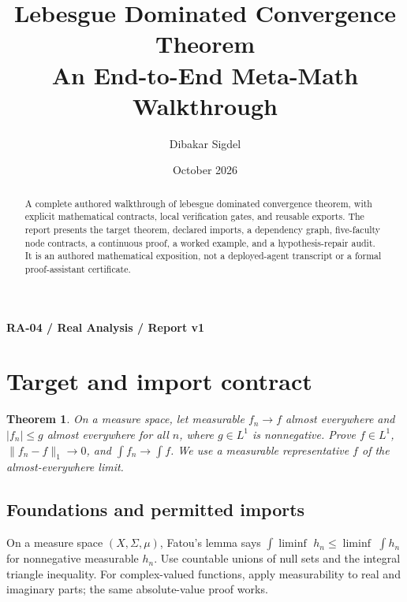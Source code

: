 \documentclass[preprint,12pt,aps,pra,showkeys,amsmath,amssymb,superscriptaddress,floatfix]{revtex4-2}
\newtheorem{theorem}{Theorem}[section]
\theoremstyle{definition}
\theoremstyle{remark}
\begin{document}
\title{Lebesgue Dominated Convergence Theorem\\[4pt]\large An End-to-End Meta-Math Walkthrough}

\author{Dibakar Sigdel}


\date{October 2026}

\begin{abstract}

A complete authored walkthrough of lebesgue dominated convergence
theorem, with explicit mathematical contracts, local verification gates,
and reusable exports. The report presents the target theorem, declared
imports, a dependency graph, five-faculty node contracts, a continuous
proof, a worked example, and a hypothesis-repair audit. It is an
authored mathematical exposition, not a deployed-agent transcript or a
formal proof-assistant certificate.

\end{abstract}\maketitle\linespread{1.12}\selectfont

\noindent\textbf{RA-04 / Real Analysis / Report v1}

\section{Target and import contract}

\begin{theorem}

On a measure space, let measurable \(f_n\to f\) almost everywhere and
\(|f_n|\le g\) almost everywhere for all \(n\), where \(g\in L^1\) is
nonnegative. Prove \(f\in L^1\), \(\|f_n-f\|_1\to 0\), and
\(\int f_n\to\int f\). We use a measurable representative \(f\) of the
almost-everywhere limit.

\end{theorem}

\subsection{Foundations and permitted imports}

On a measure space \((X,\Sigma ,\mu )\), Fatou's lemma says
\(\int \operatorname{liminf}\) \(h_n\le \operatorname{liminf}\)
\(\int h_n\) for nonnegative measurable \(h_n\). Use countable unions of
null sets and the integral triangle inequality. For complex-valued
functions, apply measurability to real and imaginary parts; the same
absolute-value proof works.
\end{document}

